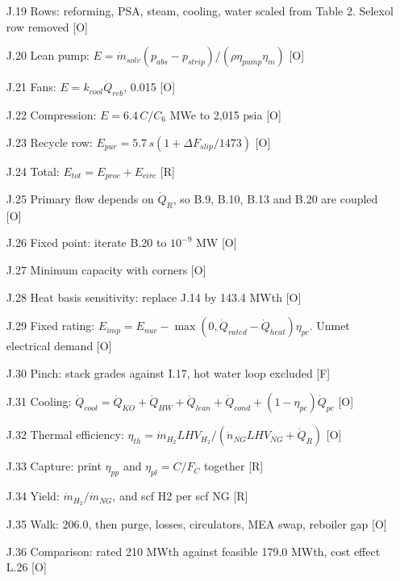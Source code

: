 \begin{enumerate}[leftmargin=1.4cm,itemsep=0pt,topsep=2pt,parsep=0pt]
\item[J.19] Rows: reforming, PSA, steam, cooling, water scaled from Table 2. Selexol row removed {\footnotesize [O]}
\item[J.20] Lean pump: $E=\dot m_{solv}(p_{abs}-p_{strip})/(\rho\eta_{pump}\eta_m)$ {\footnotesize [O]}
\item[J.21] Fans: $E=k_{cool}\dot Q_{reb}$, 0.015 {\footnotesize [O]}
\item[J.22] Compression: $E=6.4\,C/C_6$ MWe to 2,015 psia {\footnotesize [O]}
\item[J.23] Recycle row: $E_{pur}=5.7\,s(1+\Delta F_{slip}/1473)$ {\footnotesize [O]}
\item[J.24] Total: $E_{tot}=E_{proc}+E_{circ}$ {\footnotesize [R]}
\item[J.25] Primary flow depends on $\dot Q_R$, so B.9, B.10, B.13 and B.20 are coupled {\footnotesize [O]}
\item[J.26] Fixed point: iterate B.20 to $10^{-9}$ MW {\footnotesize [O]}
\item[J.27] Minimum capacity with corners {\footnotesize [O]}
\item[J.28] Heat basis sensitivity: replace J.14 by 143.4 MWth {\footnotesize [O]}
\item[J.29] Fixed rating: $E_{imp}=E_{nuc}-\max(0,\dot Q_{rated}-\dot Q_{heat})\eta_{pc}$. Unmet electrical demand {\footnotesize [O]}
\item[J.30] Pinch: stack grades against I.17, hot water loop excluded {\footnotesize [F]}
\item[J.31] Cooling: $\dot Q_{cool}=\dot Q_{KO}+\dot Q_{HW}+\dot Q_{lean}+\dot Q_{cond}+(1-\eta_{pc})\dot Q_{pc}$ {\footnotesize [O]}
\item[J.32] Thermal efficiency: $\eta_{th}=\dot m_{H_2}LHV_{H_2}/(\dot n_{NG}LHV_{NG}+\dot Q_R)$ {\footnotesize [O]}
\item[J.33] Capture: print $\eta_{pp}$ and $\eta_{pl}=C/F_C$ together {\footnotesize [R]}
\item[J.34] Yield: $\dot m_{H_2}/\dot m_{NG}$, and scf H2 per scf NG {\footnotesize [R]}
\item[J.35] Walk: 206.0, then purge, losses, circulators, MEA swap, reboiler gap {\footnotesize [O]}
\item[J.36] Comparison: rated 210 MWth against feasible 179.0 MWth, cost effect L.26 {\footnotesize [O]}
\end{enumerate}
